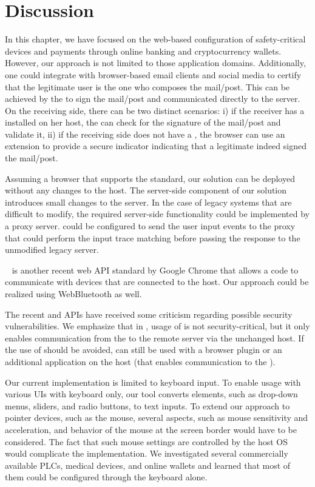 \section{Discussion}
\label{sec:discussion_IK}

 In this chapter, we have focused on the web-based configuration of safety-critical devices and payments through online banking and cryptocurrency wallets. However, our approach is not limited to those application domains. Additionally, one could integrate \name with browser-based email clients and social media to certify that the legitimate user is the one who composes the mail/post. This can be achieved by the \device to sign the mail/post and communicated directly to the server. On the receiving side, there can be two distinct scenarios: i) if the receiver has a \device installed on her host, the \device can check for the signature of the mail/post and validate it, ii) if the receiving side does not have a \device, the browser can use an extension to provide a secure indicator indicating that a legitimate \device indeed signed the mail/post.

 Assuming a browser that supports the \webusb standard, our solution can be deployed without any changes to the host. The server-side component of our solution introduces small changes to the server. In the case of legacy systems that are difficult to modify, the required server-side functionality could be implemented by a proxy server. \device could be configured to send the user input events to the proxy that could perform the input trace matching before passing the response to the unmodified legacy server. 

 \webbt~\cite{webbt} is another recent web API standard by Google Chrome that allows a \js code to communicate with devices that are connected to the host. Our approach could be realized using WebBluetooth as well.

 The recent \webusb and \webbt APIs have received some criticism regarding possible security vulnerabilities. We emphasize that in \name, usage of \webusb is not security-critical, but it only enables communication from the \device to the remote server via the unchanged host. If the use of \webusb should be avoided, \name can still be used with a browser plugin or an additional application on the host (that enables communication to the \device).

 Our current implementation is limited to keyboard input. To enable usage with various UIs with keyboard only, our tool converts elements, such as drop-down menus, sliders, and radio buttons, to text inputs. To extend our approach to pointer devices, such as the mouse, several aspects, such as mouse sensitivity and acceleration, and behavior of the mouse at the screen border would have to be considered. The fact that such mouse settings are controlled by the host OS would complicate the implementation. We investigated several commercially available PLCs, medical devices, and online wallets and learned that most of them could be configured through the keyboard alone.

